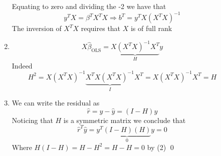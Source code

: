 \documentclass[a4paper]{article}
\begin{document}
\begin{description}
\begin{enumerate}
Equating to zero and dividing the -2 we have that
\[
y^T X = \beta^T X^T X \Rightarrow b^T = y^T X (X^T X)^{-1}
\]
The inversion of $X^T X$ requires that $X$ is of full rank
\item{}
\[
X\hat{\beta}_{\text{OLS}} = \underset{H}{\underbrace{X(X^TX)^{-1} X^T }}y
\]
Indeed
\[
H^2 = X(X^TX)^{-1} \underset{I}{\underbrace{X^T X(X^TX)^{-1}}} X^T = X(X^TX)^{-1} X^T = H
\]
\item{}
We can write the residual as
\[
\hat{r} = y-\hat{y} = (I-H)y
\]
Noticing that $H$ is a symmetric matrix we conclude that
\[
\hat{r}^T \hat{y} = y^T \underset{0}{\underbrace{(I-H)(H)}}y = 0
\]
Where $H (I-H) = H-H^2 = H-H = 0$ by (2) \qed\\
\end{enumerate}


\end{description}
\end{document}
